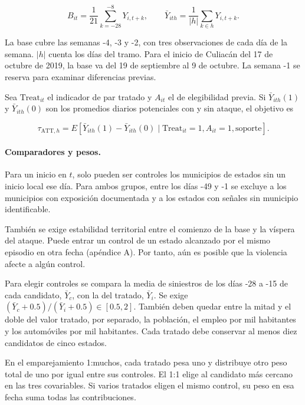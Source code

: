 \documentclass[11pt,letterpaper]{article}
\begin{document}
\[
B_{it}=\frac{1}{21}\sum_{k=-28}^{-8} Y_{i,t+k},
\qquad
\bar Y_{ith}=\frac{1}{|h|}\sum_{k\in h}Y_{i,t+k}.
\]

La base cubre las semanas -4, -3 y -2, con tres observaciones de cada día de la semana. $|h|$ cuenta los días del tramo. Para el inicio de Culiacán del 17 de octubre de 2019, la base va del 19 de septiembre al 9 de octubre. La semana -1 se reserva para examinar diferencias previas.\par

Sea $\mathrm{Treat}_{it}$ el indicador de par tratado y $A_{it}$ el de elegibilidad previa. Si $\bar Y_{ith}(1)$ y $\bar Y_{ith}(0)$ son los promedios diarios potenciales con y sin ataque, el objetivo es\par

\[
\tau_{\mathrm{ATT},h}=E[\bar Y_{ith}(1)-\bar Y_{ith}(0)\mid
\mathrm{Treat}_{it}=1,A_{it}=1,\text{soporte}].
\]

\paragraph{Comparadores y pesos.}

Para un inicio en $t$, solo pueden ser controles los municipios de estados sin un inicio local ese día. Para ambos grupos, entre los días -49 y -1 se excluye a los municipios con exposición documentada y a los estados con señales sin municipio identificable.\par

También se exige estabilidad territorial entre el comienzo de la base y la víspera del ataque. Puede entrar un control de un estado alcanzado por el mismo episodio en otra fecha (apéndice A). Por tanto, aún es posible que la violencia afecte a algún control.\par

Para elegir controles se compara la media de siniestros de los días -28 a -15 de cada candidato, $\bar Y_c$, con la del tratado, $\bar Y_i$. Se exige $(\bar Y_c+0.5)/(\bar Y_i+0.5)\in[0.5,2]$. También deben quedar entre la mitad y el doble del valor tratado, por separado, la población, el empleo por mil habitantes y los automóviles por mil habitantes. Cada tratado debe conservar al menos diez candidatos de cinco estados.\par

En el emparejamiento 1:muchos, cada tratado pesa uno y distribuye otro peso total de uno por igual entre sus controles. El 1:1 elige al candidato más cercano en las tres covariables. Si varios tratados eligen el mismo control, su peso en esa fecha suma todas las contribuciones.\par
\end{document}
